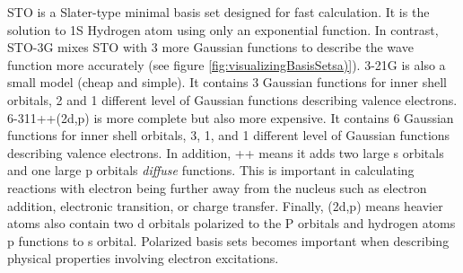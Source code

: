 \documentclass[
journal=jpcbfk, %
manuscript=article]{achemso}
\begin{document}
	STO\cite{Hehre1970} is a Slater-type minimal basis set designed for fast calculation. It is the solution to 1S Hydrogen atom using only an exponential function.  In contrast, STO-3G mixes STO with 3 more Gaussian functions to describe the wave function more accurately (see figure \ref{fig:visualizingBasisSetsa)}). 3-21G is also a small model (cheap and simple). It contains 3 Gaussian functions for inner shell orbitals, 2 and 1 different level of Gaussian functions describing valence electrons. 6-311++(2d,p) is more complete but also more expensive. It contains 6 Gaussian functions for inner shell orbitals, 3, 1, and 1 different level of Gaussian functions describing valence electrons. In addition, ++  means it adds two large s orbitals and one large p orbitals \textit{diffuse} functions. This is important in calculating reactions with electron being further away from the nucleus such as electron addition, electronic transition, or charge transfer. Finally, (2d,p) means heavier atoms also contain two d orbitals polarized to the P orbitals and hydrogen atoms p functions to s orbital. Polarized basis sets becomes important when describing physical properties involving electron excitations. 
	
\end{document}
